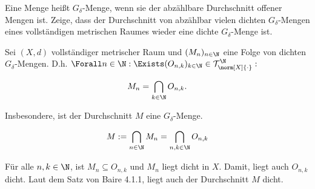 \begin{exercise}

Eine Menge heißt $G_\delta$-Menge, wenn sie der abzählbare Durchschnitt offener Mengen ist.
Zeige, dass der Durchschnitt von abzählbar vielen dichten $G_\delta$-Mengen eines vollständigen metrischen Raumes wieder eine dichte $G_\delta$-Menge ist.

\end{exercise}

\begin{solution}

Sei $(X, d)$ vollständiger metrischer Raum und $(M_n)_{n \in \N}$
eine Folge von dichten $G_\delta$-Mengen.
D.h. $\Forall n \in \N: \Exists (O_{n, k})_{k \in \N} \in \mathcal{T}_{\norm[X]{\cdot}}^\N:$

\begin{align*}
  M_n = \bigcap_{k \in \N} O_{n, k}.
\end{align*}

Insbesondere, ist der Durchschnitt $M$ eine $G_\delta$-Menge.

\begin{align*}
  M := \bigcap_{n \in \N} M_n
     = \bigcap_{n, k \in \N} O_{n, k}
\end{align*}

Für alle $n, k \in \N$, ist $M_n \subseteq O_{n, k}$ und $M_n$ liegt dicht in $X$.
Damit, liegt auch $O_{n, k}$ dicht.
Laut dem Satz von Baire 4.1.1, liegt auch der Durchschnitt $M$ dicht.

\end{solution}
